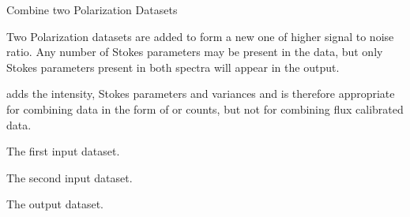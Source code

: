 \begin{manroutinedescription}
        Combine two Polarization Datasets

        Two Polarization datasets are added to form a new one of
        higher signal to noise ratio. Any number of Stokes parameters
        may be present in the data, but only Stokes parameters present
        in both spectra will appear in the output.

        {} adds the intensity, Stokes parameters and variances
        and is therefore appropriate for combining data in the form
        of {} or {} counts, but not for combining flux %
calibrated
        data.

\begin{manparametertable}
\begin{manitemize}
\manitemizeitem The first input dataset.
\end{manitemize}
\begin{manitemize}
\manitemizeitem The second input dataset.
\end{manitemize}
\begin{manitemize}
\manitemizeitem The output dataset.
\end{manitemize}

\end{manparametertable}
\end{manroutinedescription}
